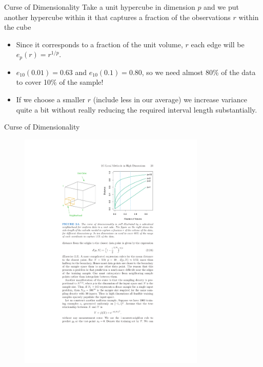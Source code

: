 \documentclass[11pt,handout,xcolor=pdftex,dvipsnames,table,mathserif,aspectratio=169]{beamer}
\begin{document}
\begin{frame}{Curse of Dimensionality}
Take a unit hypercube in dimension $p$ and we put another hypercube within it that captures a fraction of the observations $r$ within the cube
\begin{itemize}
\item Since it corresponds to a fraction of the unit volume, $r$ each edge  will be $e_p(r) = r^{1/p}$.
\item $e_{10}(0.01) = 0.63$ and $e_{10}(0.1) = 0.80$, so we need almost 80\% of the data to cover 10\% of the sample!
\item If we choose a smaller $r$ (include less in our average) we increase variance quite a bit without really reducing the required interval length substantially.
\end{itemize}
\end{frame}

\begin{frame}{Curse of Dimensionality}
\begin{figure}[htbp]
\begin{center}
\includegraphics[width=3.5in]{./resources/figure26.pdf}
\label{class15nn}
\end{center}
\end{figure}
\end{frame}
\end{document}
